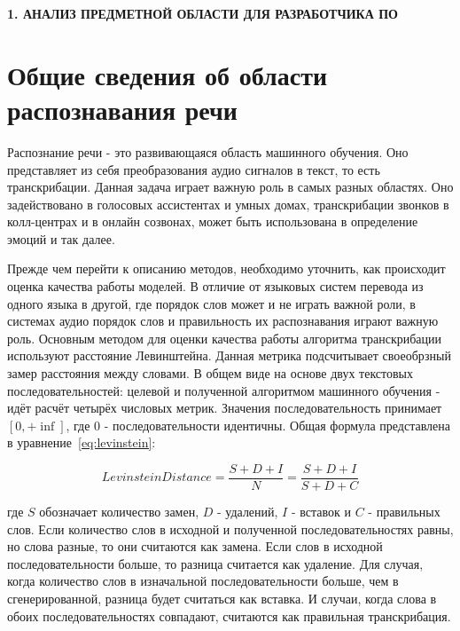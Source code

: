 \newpage
\begin{center}
  \textbf{\large 1. АНАЛИЗ ПРЕДМЕТНОЙ ОБЛАСТИ ДЛЯ РАЗРАБОТЧИКА ПО}
\end{center}


\section{Общие сведения об области распознавания речи}

Распознание речи - это развивающаяся область машинного обучения.
Оно представляет из себя преобразования аудио сигналов в текст, то есть транскрибации.
Данная задача играет важную роль в самых разных областях.
Оно задействовано в голосовых ассистентах и умных домах, транскрибации звонков в колл-центрах и в онлайн созвонах, может быть использована в определение эмоций и так далее.

Прежде чем перейти к описанию методов, необходимо уточнить, как происходит оценка качества работы моделей.
В отличие от языковых систем перевода из одного языка в другой, где порядок слов может и не играть важной роли, в системах аудио порядок слов и правильность их распознавания играют важную роль.
Основным методом для оценки качества работы алгоритма транскрибации используют расстояние Левинштейна.
Данная метрика подсчитывает своеобрзный замер расстояния между словами.
В общем виде на основе двух текстовых последовательностей: целевой и полученной алгоритмом машинного обучения - идёт расчёт четырёх числовых метрик.
Значения последовательность принимает $[0, +\inf]$, где 0 - последовательности идентичны.
Общая формула представлена в уравнение~\ref{eq:levinstein}:

\begin{equation}
  Levinstein Distance = \frac{S + D + I}{N} = \frac{S + D + I}{S + D + C}
  \label{eq:levinstein}
\end{equation}

где $S$ обозначает количество замен, $D$ - удалений, $I$ - вставок и $C$ - правильных слов. 
Если количество слов в исходной и полученной последовательностях равны, но слова разные, то они считаются как замена. 
Если слов в исходной последовательности больше, то разница считается как удаление.
Для случая, когда количество слов в изначальной последовательности больше, чем в сгенерированной, разница будет считаться как вставка.
И случаи, когда слова в обоих последовательностях совпадают, считаются как правильная транскрибация.

